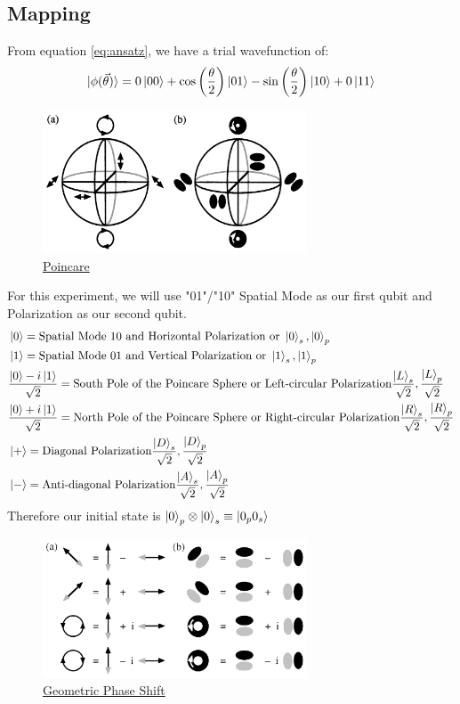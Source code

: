 \documentclass{article}
\begin{document}
\subsection{Mapping}
From equation \eqref{eq:ansatz}, we have a trial wavefunction of:
\begin{equation}
	|\phi(\vec{\theta})\rangle = 0\ket{00} + \cos\left(\frac{\theta}{2}\right)|01\rangle - \sin\left(\frac{\theta}{2}\right)|10\rangle + 0\ket{11}
\end{equation}
\begin{figure}[H]
	\centering
	\includegraphics[width=0.7\textwidth, height=0.3\textheight]{poincare.jpeg}
	\caption{\href{https://opg.optica.org/ol/fulltext.cfm?uri=ol-24-7-430&id=37205}{Poincare}}
\end{figure}
For this experiment, we will use "01"/"10" Spatial Mode as our first qubit and Polarization as our second qubit.
\begin{align*}
	&\ket{0} = \text{Spatial Mode 10 and Horizontal Polarization or } \ket{0}_s, \ket{0}_p  \\
	&\ket{1} = \text{Spatial Mode 01 and Vertical Polarization or } \ket{1}_s, \ket{1}_p \\
	&\frac{\ket{0}-i\ket{1}}{\sqrt{2}} = \text{South Pole of the Poincare Sphere or Left-circular Polarization} \frac{\ket{L}_s}{\sqrt{2}}, \frac{\ket{L}_p}{\sqrt{2}} \\
	&\frac{\ket{0}+i\ket{1}}{\sqrt{2}} = \text{North Pole of the Poincare Sphere or Right-circular Polarization} \frac{\ket{R}_s}{\sqrt{2}}, \frac{\ket{R}_p}{\sqrt{2}}\\
	&\ket{+} = \text{Diagonal Polarization} \frac{\ket{D}_s}{\sqrt{2}}, \frac{\ket{D}_p}{\sqrt{2}} \\
	&\ket{-} = \text{Anti-diagonal Polarization} \frac{\ket{A}_s}{\sqrt{2}}, \frac{\ket{A}_p}{\sqrt{2}}
\end{align*}
Therefore our initial state is \( \ket{0}_p \otimes \ket{0}_s \equiv \ket{0_p 0_s}\)
\begin{figure}[H]
	\centering
	\includegraphics[width=0.7\textwidth, height=0.3\textheight]{phaseShift.jpeg}
	\caption{\href{https://opg.optica.org/ol/fulltext.cfm?uri=ol-24-7-430&id=37205}{Geometric Phase Shift}}	
\end{figure}
\end{document}
